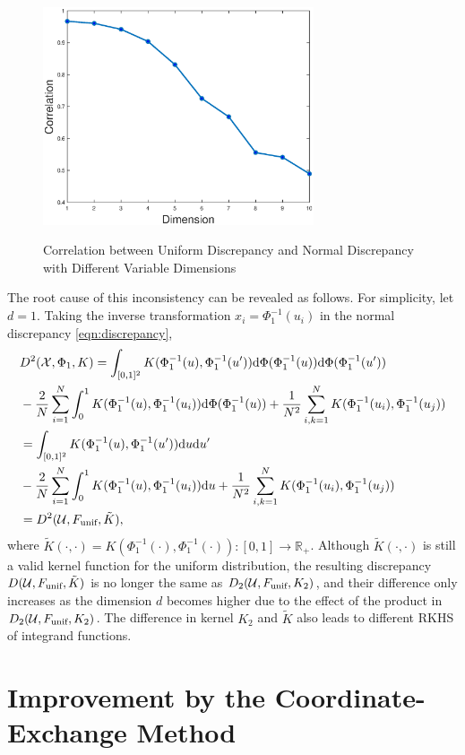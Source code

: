 \documentclass[graybox]{svmult}
\newcommand{\dif}{{\rm d}}
\newcommand{\Udes}{\mathcal{U}}
\newcommand{\Xdes}{\mathcal{X}}
\newcommand{\unif}{\textup{unif}}
\begin{document}
\begin{figure}[ht]
\label{fig:DimVsDisc}
\centering
{\includegraphics[width=8cm]{dimVsdisc.eps}}
\caption{Correlation between Uniform Discrepancy and Normal Discrepancy with Different Variable Dimensions}
\end{figure}

The root cause of this inconsistency can be revealed as follows. 
For simplicity, let $d=1$. 
Taking the inverse transformation $x_{i}=\Phi^{-1}_1(u_{i})$ in the normal discrepancy \eqref{eqn:discrepancy}, 
\begin{align*}
&D^2(\Xdes, \Phi_1, K) = \int_{[0,1]^2} K(\Phi^{-1}_1(u),\Phi^{-1}_1(u'))\dif \Phi(\Phi^{-1}_1(u))\dif \Phi(\Phi^{-1}_1(u'))\\
&-\frac{2}{N}\sum_{i=1}^N \int_0^1 K(\Phi^{-1}_1(u),\Phi^{-1}_1(u_i))\dif \Phi(\Phi^{-1}_1(u))+\frac{1}{N^2}\sum_{i,k=1}^N K(\Phi^{-1}_1(u_i), \Phi^{-1}_1(u_j))\\
&=\int_{[0,1]^2} K(\Phi^{-1}_1(u),\Phi^{-1}_1(u'))\dif u\dif u'\\
&-\frac{2}{N}\sum_{i=1}^N \int_0^1 K(\Phi^{-1}_1(u),\Phi^{-1}_1(u_i))\dif u+\frac{1}{N^2}\sum_{i,k=1}^N K(\Phi^{-1}_1(u_i), \Phi^{-1}_1(u_j))\\
&=D^2(\Udes,F_\unif,\tilde{K}),
\end{align*}
where $\tilde{K}(\cdot,\cdot)=K(\Phi^{-1}_1(\cdot), \Phi^{-1}_1(\cdot)): [0, 1]\rightarrow \mathbb{R}_{+}$. 
Although $\tilde{K}(\cdot,\cdot)$ is still a valid kernel function for the uniform distribution, the resulting discrepancy $D(\Udes,F_\unif, \tilde{K})$ is no longer the same as $D_2(\Udes, F_\unif, K_2)$, and their difference only increases as the dimension $d$ becomes higher due to the effect of the product in $D_2(\Udes, F_\unif, K_2)$. 
The difference in kernel $K_2$ and $\tilde{K}$ also leads to different RKHS of integrand functions. 

\section{Improvement by the Coordinate-Exchange Method}\label{sec:CoordEx}
\end{document}
